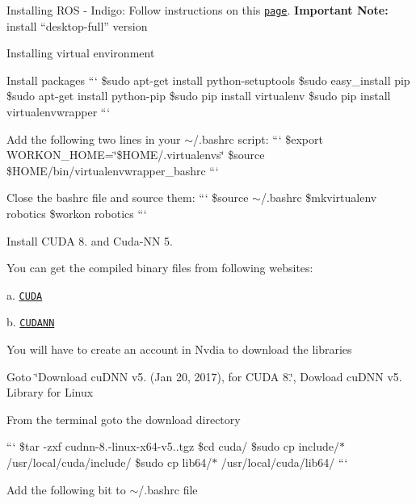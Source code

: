 \begin{DoxyEnumerate}
\item Installing R\+OS -\/ Indigo\+: Follow instructions on this \href{http://wiki.ros.org/indigo/Installation/Ubuntu}{\tt page}. {\bfseries Important Note\+:} install “desktop-\/full” version
\item Installing virtual environment
\begin{DoxyItemize}
\item Install packages ``` \$sudo apt-\/get install python-\/setuptools \$sudo easy\+\_\+install pip \$sudo apt-\/get install python-\/pip \$sudo pip install virtualenv \$sudo pip install virtualenvwrapper ```
\item Add the following two lines in your $\sim$/.bashrc script\+: ``` \$export W\+O\+R\+K\+O\+N\+\_\+\+H\+O\+ME=\char`\"{}\$\+H\+O\+M\+E/.\+virtualenvs\char`\"{} \$source \$\+H\+O\+ME/bin/virtualenvwrapper\+\_\+bashrc ```
\item Close the bashrc file and source them\+: ``` \$source $\sim$/.bashrc \$mkvirtualenv robotics \$workon robotics ```
\end{DoxyItemize}
\item Install C\+U\+DA 8. and Cuda-\/\+NN 5.

You can get the compiled binary files from following websites\+:

a. \href{https://developer.nvidia.com/cuda-downloads}{\tt C\+U\+DA}

b. \href{https://developer.nvidia.com/cudnn}{\tt C\+U\+D\+A\+NN}
\begin{DoxyItemize}
\item You will have to create an account in Nvdia to download the libraries
\item Goto \char`\"{}\+Download cu\+D\+N\+N v5. (\+Jan 20, 2017), for C\+U\+D\+A 8.\char`\"{}, Dowload cu\+D\+NN v5. Library for Linux
\item From the terminal goto the download directory

``` \$tar -\/zxf cudnn-\/8.-\/linux-\/x64-\/v5..\+tgz \$cd cuda/ \$sudo cp include/$\ast$ /usr/local/cuda/include/ \$sudo cp lib64/$\ast$ /usr/local/cuda/lib64/ ```
\item Add the following bit to $\sim$/.bashrc file


\end{DoxyItemize}
\end{DoxyEnumerate}
